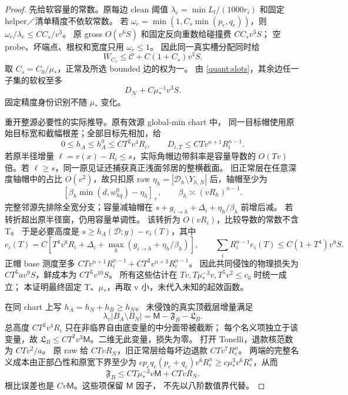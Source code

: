\begin{proof}
先给软容量的常数。原每边 clean 阈值
\(\lambda_e=\min L_l/(1000r_i)\) 和固定 helper／清单精度不依软常数。
若 \(\omega_e=\min(1,C_s\min(p_e,q_e))\)，则
\(\omega_e/\lambda_e\le CC_s/v^3\)。
原 gross \(O(v^6S)\) 和固定反向重数给碰撞费 \(CC_sv^3S\)；
空 probe、坏端点、根权和宽度只用 \(\omega_e\le1\)。
因此同一真实槽分配同时给
\[
 W_{C_s}\le\mathcal C+C(1+C_s)v^3S.
\]
取 \(C_s=C_0/\mu_*\)，正常及所选 bounded 边的权为一。
由 \eqref{quant:slots}，其余边任一子集的软权至多
\begin{equation}\label{quant:bad-capacity}
 D_{\mathcal N}+C\mu_*^{-1}v^3S.
\end{equation}
固定精度身份识别不随 \(\mu_*\) 变化。

重开整源必要性的实际推导。原有效源 global-min chart 中，
同一目标帽使用原始目标宽和截幅根差；全部目标先相加，给
\[
 0\le h_A\le h_A^0\le CT^2v^4R_i,\qquad
 D_{i,T}\le CTv^{n+1}R_i^{n-1}.
\]
若原半径增量 \(\ell=r(x)-R_i\le s\)，实际角帽边带斜率是容量导数的
\(O(Tv)\) 倍。若 \(\ell\ge s\)，同一原见证还捕获真正浅面邻居的整横截面。
旧正常层在任意深度轴帽中的占比 \(O(v^2)\)，故只扣原 raw
\(\eta_h=|\mathscr D_h\setminus Y_{h,N}|\) 后，轴帽至少为
\[
 [\beta_h\min(d,w^0_{hq})-\eta_h]_+,\qquad
 \beta_h\asymp(vR_h)^{n-1}.
\]
完整邻源先排除全宽分支；容量减轴帽在
\(s+g_{i\to h}+\Delta_i+\eta_h/\beta_h\) 前增后减。
若转折超出原半径窗，仍用容量单调性。
该转折为 \(O(vR_i)\)，比较导数的常数不含 T。
于是必要高度是 \(s\ge h_A(\mathscr D;y)-e_i(T)\)，其中
\[
 e_i(T)=C[T^4v^8R_i+\Delta_i+
                     \max_h(g_{i\to h}+\eta_h/\beta_h)],\qquad
 \sum_iR_i^{n-1}e_i(T)\le C(1+T^4)v^8S.
\]
正帽 base 测度至多
\(CTv^{n+1}R_i^{n-1}+CT^2v^{n+3}R_i^{n-1}\)。
因此共同侵蚀的物理损失为 \(CT^5av^9S\)，鲜成本为 \(CT^5v^{10}S\)。
所有这些估计在
\(Tv,T\mu_*^{-3}v,T^5v^2\le c_0\) 时统一成立；
本证明最终固定 T、\(\mu_*\)，再取 v 小，未代入未知的起效函数。

在同 chart 上写 \(h_A=h_N+h_B\ge h_N\)。
未侵蚀的真实顶截层增量满足
\[
 \lambda_v|B_A\setminus B_N|
       =\mathsf M-\mathfrak F_B-\mathfrak L_B.
\]
总高度 \(CT^2v^4R_i\) 只在非临界自由底变量的中分面带被截断；
每个名义项独立于该变量，故
\(\mathfrak L_B\le CT^2v^3\mathsf M\)。二维无此变量，损失为零。
打开 Tonelli，退款核范数为 \(CTv^2/a\)。
原 raw 给 \(CTvR_N\)，旧正常层给每坏边退款 \(CTv^7R_e^n\)。
两端的完整名义成本由正部凸性和原宽下界至少为
\(cp_eq_e(p_e+q_e)v^6R_e^n\ge c\mu_*^3v^6R_e^n\)，从而
\[
 \mathfrak F_B\le CT\mu_*^{-3}v\mathsf M+CTvR_N.
\]
根比误差也是 \(Cv\mathsf M\)。这些项保留 \(\mathsf M\) 因子，
不先以八阶数值界代替。


\end{proof}
